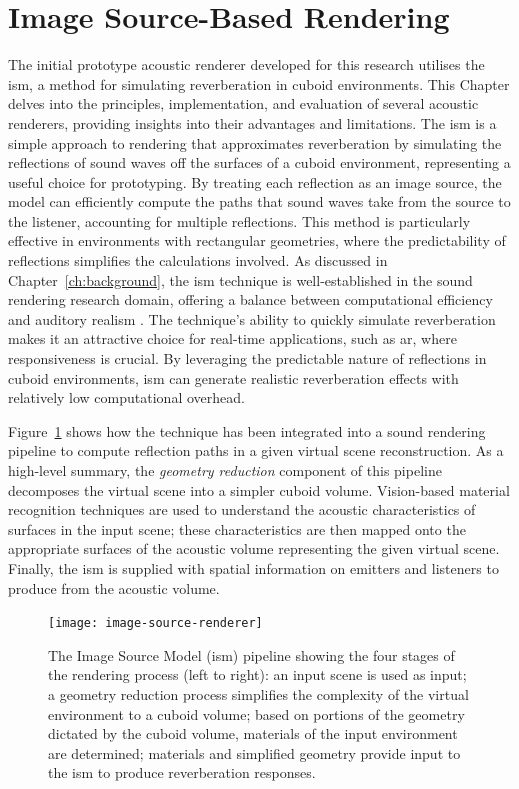 \section{Image Source-Based Rendering}
The initial prototype acoustic renderer developed for this research utilises the \acrfull{ism}, a method for simulating reverberation in cuboid environments. This Chapter delves into the principles, implementation, and evaluation of several acoustic renderers, providing insights into their advantages and limitations. The \acrshort{ism} is a simple approach to rendering that approximates reverberation by simulating the reflections of sound waves off the surfaces of a cuboid environment, representing a useful choice for prototyping. By treating each reflection as an image source, the model can efficiently compute the paths that sound waves take from the source to the listener, accounting for multiple reflections. This method is particularly effective in environments with rectangular geometries, where the predictability of reflections simplifies the calculations involved. As discussed in Chapter~\ref{ch:background}, the \acrshort{ism} technique is well-established in the sound rendering research domain, offering a balance between computational efficiency and auditory realism  \citep{savioja1999creating, allen1979image}. The technique's ability to quickly simulate reverberation makes it an attractive choice for real-time applications, such as \acrshort{ar}, where responsiveness is crucial. By leveraging the predictable nature of reflections in cuboid environments, \acrshort{ism} can generate realistic reverberation effects with relatively low computational overhead.\par
Figure~\ref{fig:image-source-pipeline} shows how the technique has been integrated into a sound rendering pipeline to compute reflection paths in a given virtual scene reconstruction. As a high-level summary, the \emph{geometry reduction} component of this pipeline decomposes the virtual scene into a simpler cuboid volume. Vision-based material recognition techniques are used to understand the acoustic characteristics of surfaces in the input scene; these characteristics are then mapped onto the appropriate surfaces of the acoustic volume representing the given virtual scene. Finally, the \acrshort{ism} is supplied with spatial information on emitters and listeners to produce  from the acoustic volume.\par

\begin{figure}[htb]
    \centering
    \texttt{[image: image-source-renderer]}
    \caption[Image-Source Model-based acoustic rendering pipeline]{The Image Source Model (\acrshort{ism}) pipeline showing the four stages of the rendering process (left to right): an input scene is used as input; a geometry reduction process simplifies the complexity of the virtual environment to a cuboid volume; based on portions of the geometry dictated by the cuboid volume, materials of the input environment are determined; materials and simplified geometry provide input to the \acrshort{ism} to produce reverberation responses.}\label{fig:image-source-pipeline}
\end{figure}

